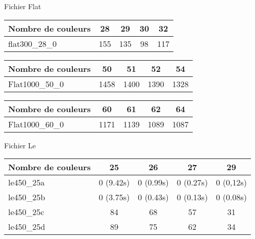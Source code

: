 \documentclass{beamer}
\begin{document}
		\begin{frame}{Fichier Flat}
		
	\begin{tabular}{|l|c|c|c|c|}
  	\hline
	Nombre de couleurs & 28 & 29 & 30 & 32 \\
  	\hline
	flat300\_28\_0 & 155 & 135 & 98 & 117 \\
	\hline
	\end{tabular}
	
	\begin{tabular}{|l|c|c|c|c|}
  	\hline
	Nombre de couleurs & 50 & 51 & 52 & 54 \\
  	\hline
	Flat1000\_50\_0 & 1458 & 1400 & 1390 & 1328 \\
	\hline
	\end{tabular}
	
	\begin{tabular}{|l|c|c|c|c|}
  	\hline
	Nombre de couleurs & 60 & 61 & 62 & 64 \\
  	\hline
	Flat1000\_60\_0 & 1171 & 1139 & 1089 & 1087 \\
	\hline
	\end{tabular}

		\end{frame}
		
		\begin{frame}{Fichier Le}
			\begin{tabular}{|l|c|c|c|c|}
  	\hline
	Nombre de couleurs & 25 & 26 & 27 & 29 \\
  	\hline
le450\_25a & 0 (9.42s) & 0 (0.99s) & 0 (0.27s) & 0 (0,12s) \\
le450\_25b & 0 (3.75s) & 0 (0.43s) & 0 (0.13s) & 0 (0.08s) \\
le450\_25c & 84 & 68 & 57 & 31 \\
le450\_25d & 89 & 75 & 62 & 34 \\
	\hline
		\end{tabular}


		\end{frame}
	
\end{document}
